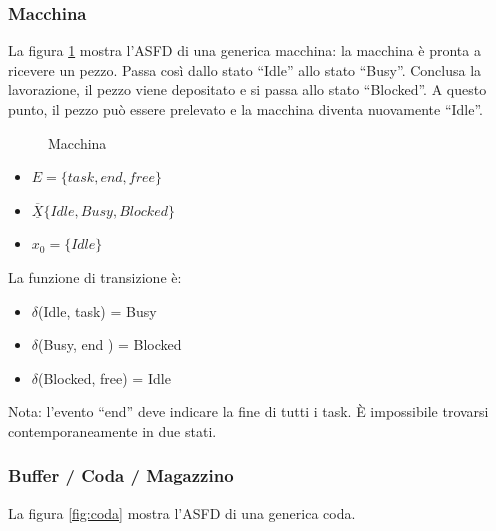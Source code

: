\documentclass[a4paper]{report}
\begin{document}
\subsubsection{Macchina}
La figura \ref{fig:macchina} mostra l'ASFD di una generica macchina:
la macchina \`e pronta a ricevere un pezzo. Passa cos\`i dallo stato
``Idle'' allo stato ``Busy''. Conclusa la lavorazione, il pezzo viene
depositato e si passa allo stato ``Blocked''. A questo punto, il pezzo
pu\`o essere prelevato e la macchina diventa nuovamente ``Idle''.
\begin{figure}[!h]
  \centering
  \caption{Macchina}
  \label{fig:macchina}
\end{figure}

\begin{itemize}
\item $E = \{ task, end, free \}$
\item $\overline{\underline{X}} \{ Idle, Busy, Blocked\}$
\item $x_0 = \{ Idle\}$
\end{itemize}

La funzione di transizione \`e:
\begin{itemize}
\item $\delta$(Idle, task) = Busy
\item $\delta$(Busy, end ) = Blocked
\item $\delta$(Blocked, free) = Idle
\end{itemize}

Nota: l'evento ``end'' deve indicare la fine di tutti i task. \`E
impossibile trovarsi contemporaneamente in due stati.

\subsubsection{Buffer / Coda / Magazzino}
La figura \ref{fig:coda} mostra l'ASFD di una generica coda.
\end{document}
